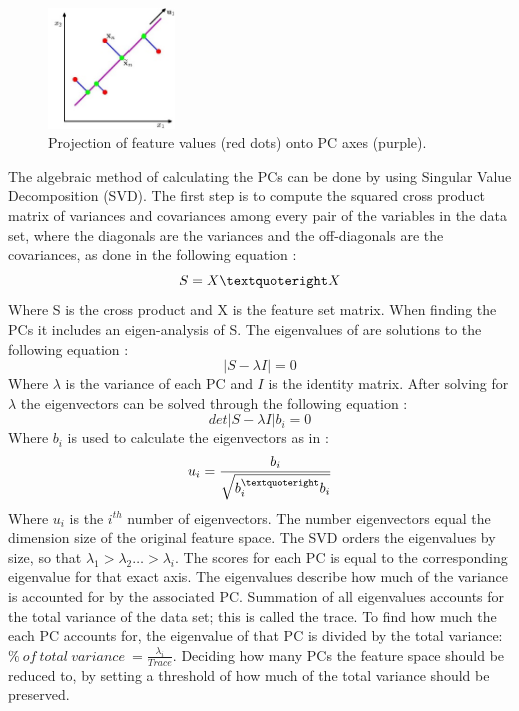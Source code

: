\begin{figure}[H] 
	\includegraphics[width=0.3\textwidth]{figures/zASP/projection}
	\caption{Projection of feature values (red dots) onto PC axes (purple).}
	\label{projection}
\end{figure}
\vspace{-10pt}
The algebraic method of calculating the PCs can be done by using Singular Value Decomposition (SVD). The first step is to compute the squared cross product matrix of variances and covariances among every pair of the variables in the data set, where the diagonals are the variances and the off-diagonals are the covariances, as done in the following equation \cite{Semmlow2014}:
\begin{equation}
S = X \textquoteright X
\end{equation}
Where S is the cross product and X is the feature set matrix. When finding the PCs it includes an eigen-analysis of S. The eigenvalues of are solutions to the following equation \cite{Semmlow2014}:
\begin{equation}
| S - \lambda I |  = 0
\end{equation}
Where $\lambda$ is the variance of each PC and $I$ is the identity matrix. After solving for $\lambda$ the eigenvectors can be solved through the following equation \cite{Semmlow2014}:
\begin{equation}
det | S - \lambda I | b_{i} = 0
\end{equation}
Where $b_{i}$ is used to calculate the eigenvectors as in \cite{Semmlow2014}:
\begin{eqnarray}
u_{i} = \frac{b_{i}}{\sqrt{b_{i}^{\textquoteright} b_{i}}}
\end{eqnarray}
Where $u_{i}$ is the $i^{th}$ number of eigenvectors. The number eigenvectors equal the dimension size of the original feature space. 
The SVD orders the eigenvalues by size, so that $\lambda_{1} > \lambda_{2} … > \lambda_{i}$. The scores for each PC is equal to the corresponding eigenvalue for that exact axis. The eigenvalues describe how much of the variance is accounted for by the associated PC. Summation of all eigenvalues accounts for the total variance of the data set; this is called the trace. To find how much the each PC accounts for, the eigenvalue of that PC is divided by the total variance: $\%~ of~ total~ variance~ = \frac{\lambda_{i}}{Trace}$. Deciding how many PCs the feature space should be reduced to, by setting a threshold of how much of the total variance should be preserved. \cite{Semmlow2014}

